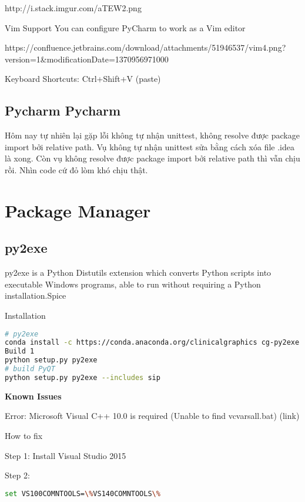 http://i.stack.imgur.com/aTEW2.png

Vim Support
You can configure PyCharm to work as a Vim editor

https://confluence.jetbrains.com/download/attachments/51946537/vim4.png?version=1&modificationDate=1370956971000

Keyboard Shortcuts: Ctrl+Shift+V (paste)

\subsection{Pycharm Pycharm}


Hôm nay tự nhiên lại gặp lỗi không tự nhận unittest, không resolve được package import bởi relative path. Vụ không tự nhận unittest sửa bằng cách xóa file .idea là xong. Còn vụ không resolve được package import bởi relative path thì vẫn chịu rồi. Nhìn code cứ đỏ lòm khó chịu thật.

\section{Package Manager}

\subsection{py2exe}

py2exe is a Python Distutils extension which converts Python scripts into executable Windows programs, able to run without requiring a Python installation.Spice

Installation
\begin{lstlisting}[language=bash]
# py2exe
conda install -c https://conda.anaconda.org/clinicalgraphics cg-py2exe
Build 1
python setup.py py2exe
# build PyQT
python setup.py py2exe --includes sip
\end{lstlisting}

\textbf{Known Issues}

Error: Microsoft Visual C++ 10.0 is required (Unable to find vcvarsall.bat) (link)

How to fix


Step 1: Install Visual Studio 2015

Step 2:

\begin{lstlisting}[language=bash]
set VS100COMNTOOLS=\%VS140COMNTOOLS\%
\end{lstlisting}

